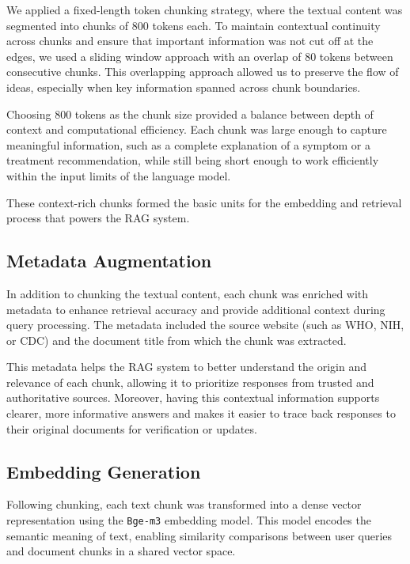 We applied a fixed-length token chunking strategy, where the textual content was segmented into chunks of 800 tokens each. To maintain contextual continuity across chunks and ensure that important information was not cut off at the edges, we used a sliding window approach with an overlap of 80 tokens between consecutive chunks. This overlapping approach allowed us to preserve the flow of ideas, especially when key information spanned across chunk boundaries.

Choosing 800 tokens as the chunk size provided a balance between depth of context and computational efficiency. Each chunk was large enough to capture meaningful information, such as a complete explanation of a symptom or a treatment recommendation, while still being short enough to work efficiently within the input limits of the language model.

These context-rich chunks formed the basic units for the embedding and retrieval process that powers the RAG system.

\subsection{Metadata Augmentation}
\label{subsec:metadata}

In addition to chunking the textual content, each chunk was enriched with metadata to enhance retrieval accuracy and provide additional context during query processing. The metadata included the source website (such as WHO, NIH, or CDC) and the document title from which the chunk was extracted.

This metadata helps the RAG system to better understand the origin and relevance of each chunk, allowing it to prioritize responses from trusted and authoritative sources. Moreover, having this contextual information supports clearer, more informative answers and makes it easier to trace back responses to their original documents for verification or updates.

\subsection{Embedding Generation}
\label{subsec:embeddings}

Following chunking, each text chunk was transformed into a dense vector representation using the \texttt{Bge-m3} embedding model. This model encodes the semantic meaning of text, enabling similarity comparisons between user queries and document chunks in a shared vector space.

